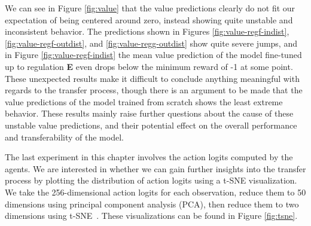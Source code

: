 We can see in Figure \ref{fig:value} that the value predictions clearly do not fit our expectation of being centered around zero, instead showing quite unstable and inconsistent behavior.
The predictions shown in Figures \ref{fig:value-regf-indist}, \ref{fig:value-regf-outdist}, and \ref{fig:value-regg-outdist} show quite severe jumps, and in Figure \ref{fig:value-regf-indist} the mean value prediction of the model fine-tuned up to regulation \textbf{E} even drops below the minimum reward of -1 at some point.
These unexpected results make it difficult to conclude anything meaningful with regards to the transfer process, though there is an argument to be made that the value predictions of the model trained from scratch shows the least extreme behavior.
These results mainly raise further questions about the cause of these unstable value predictions, and their potential effect on the overall performance and transferability of the model.

The last experiment in this chapter involves the action logits computed by the agents.
We are interested in whether we can gain further insights into the transfer process by plotting the distribution of action logits using a t-SNE visualization.
We take the 256-dimensional action logits for each observation, reduce them to 50 dimensions using principal component analysis (PCA), then reduce them to two dimensions using t-SNE~\cite{van2008tsne}.
These visualizations can be found in Figure \ref{fig:tsne}.

